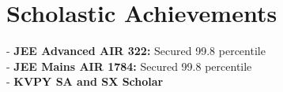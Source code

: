 \documentclass[a4paper,10pt]{extarticle} %
\begin{document}

\vspace{0.2cm}
\section{\textcolor{primary}{Scholastic Achievements}}

- \textbf{JEE Advanced AIR 322: } Secured 99.8 percentile \\
- \textbf{JEE Mains AIR 1784: } Secured 99.8 percentile \\
- \textbf{KVPY SA and SX Scholar } \\



\end{document}
